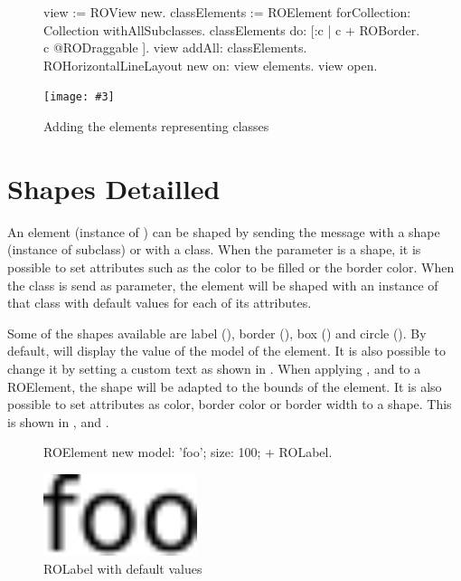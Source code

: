 \documentclass[a4paper,10pt,twoside]{book}
\newcommand{\fig}[4]{
		\begin{figure}[#1]
			\centering
			\texttt{[image: \#3]}
			\caption{\label{fig:#3}#4}
		\end{figure}}
\begin{document}
\begin{figure}[H]
\begin{code}{}
view := ROView new.
classElements := ROElement forCollection: Collection withAllSubclasses.
classElements 
	do: [:c | c + ROBorder.
			c @RODraggable ].
view addAll: classElements.
ROHorizontalLineLayout new on: view elements.
view open.
\end{code}
\end{figure}

\fig{H}{0.6}{hier1}{Adding the elements representing classes}


\section{Shapes Detailled} 

An element (instance of ) can be shaped by sending the \ct{+} message with a shape (instance of  subclass) or with a  class. 
When the parameter is a shape, it is possible to set attributes such as the color to be filled or the border color. When the class is send as parameter, the element will be shaped with an instance of that class with default values for each of its attributes.

Some of the shapes available are label (), border (), box () and circle (). By default,  will display the  value of the model of the element. It is also possible to change it by setting a custom text as shown in . When applying ,  and  to a ROElement, the shape will be adapted to the bounds of the element. It is also possible to set attributes as color, border color or border width to a shape. This is shown in ,  and .

\begin{figure}[H]
      \begin{minipage}[t]{0.5\textwidth}
      \vspace{0pt}
	     \begin{code}[!]
     
	ROElement new
		model: 'foo';
		size: 100; 
		+ ROLabel.	\end{code}
   \end{minipage}
   \hfill
   \begin{minipage}[t]{0.4\textwidth}
      \vspace{0pt} \raggedright
       \centering
		\includegraphics[width=0.4\textwidth]{label}
   \end{minipage}
\caption{ROLabel with default values}
\label{fig:label}
\end{figure}
\end{document}
